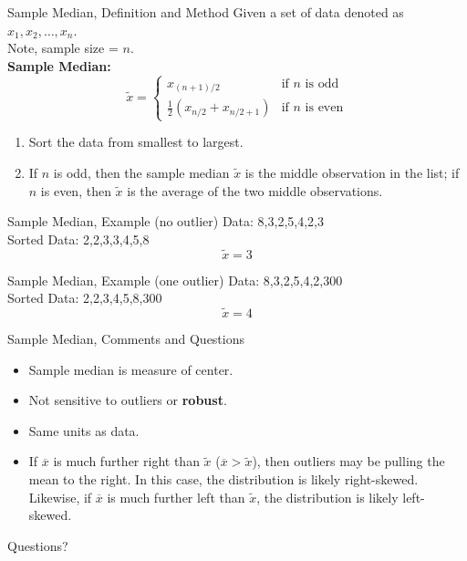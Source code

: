 \documentclass{beamer}
\newcommand{\qtns}[0]{\begin{center} Questions? \end{center}}
\newcommand{\nl}[1]{\vspace{#1 em}}
\begin{document}
\begin{frame}{Sample Median, Definition and Method}
    Given a set of data denoted as $x_1, x_2, \ldots, x_n$. \\
    Note, sample size = $n$.\\
    \nl{1}
    {\bf Sample Median:}
    $$\tilde{x} = \begin{cases}
            x_{(n+1)/2}                 & \text{if $n$ is odd}  \\
            \frac12(x_{n/2} +x_{n/2+1}) & \text{if $n$ is even}
        \end{cases}$$
    \begin{enumerate}
        \item  Sort the data from smallest to largest.
        \item If $n$ is odd, then the sample median $\tilde{x}$ is the middle observation in the list; if $n$ is even, then $\tilde{x}$ is the average of the two middle observations.
    \end{enumerate}
\end{frame}

\begin{frame}{Sample Median, Example (no outlier)}
    Data: 8,3,2,5,4,2,3\\
    \nl{0.5}
    Sorted Data: 2,2,3,3,4,5,8\\
    \nl{0.5}
    \[\tilde{x} = 3\]
\end{frame}

\begin{frame}{Sample Median, Example (one outlier)}
    Data: 8,3,2,5,4,2,300\\
    \nl{0.5}
    Sorted Data: 2,2,3,4,5,8,300\\
    \nl{0.5}
    \[\tilde{x} = 4\]
\end{frame}

\begin{frame}{Sample Median, Comments and Questions}
    \begin{itemize}
        \item Sample median is measure of center.
        \item Not sensitive to outliers or {\bf robust}.
        \item Same units as data.
        \item If $\overline{x}$ is much further right than $\tilde{x}$ ($\overline{x}>\tilde{x}$), then outliers may be pulling the mean to the right. In this case, the distribution is likely right-skewed. Likewise, if $\overline{x}$ is much further left than $\tilde{x}$, the distribution is likely left-skewed.
    \end{itemize}
    \qtns
\end{frame}
\end{document}
